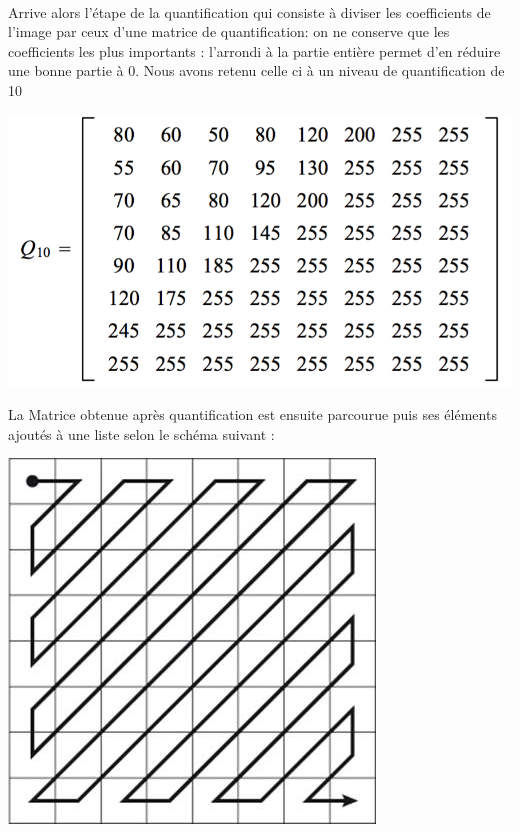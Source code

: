 \documentclass[12pt]{article}
\begin{document}
\paragraph{}
 Arrive alors l’étape de la quantification qui consiste à diviser les coefficients de l’image par ceux d’une matrice de quantification: on ne conserve que les coefficients les plus importants : l'arrondi à la partie entière permet d'en réduire une bonne partie à 0. Nous avons retenu celle ci à un niveau de quantification de 10%
 \begin{center}
 \includegraphics[scale=0.75]{photo1}
 \end{center}
\newpage
La Matrice obtenue après quantification est ensuite parcourue puis ses éléments ajoutés à une liste selon le schéma suivant :

 \begin{center}
 \includegraphics[scale=0.7]{image4}
 \end{center}
	
\end{document}
